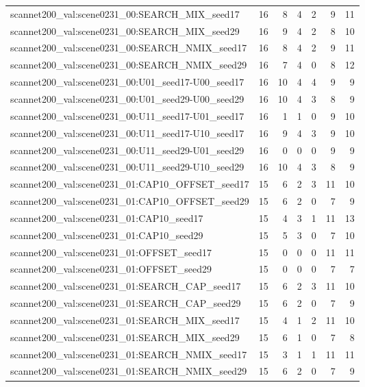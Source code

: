 \begin{table}[t]
\begin{tabular}{lrrrrrr}
scannet200\_val:scene0231\_00:SEARCH\_MIX\_seed17 & 16 & 8 & 4 & 2 & 9 & 11 \\
scannet200\_val:scene0231\_00:SEARCH\_MIX\_seed29 & 16 & 9 & 4 & 2 & 8 & 10 \\
scannet200\_val:scene0231\_00:SEARCH\_NMIX\_seed17 & 16 & 8 & 4 & 2 & 9 & 11 \\
scannet200\_val:scene0231\_00:SEARCH\_NMIX\_seed29 & 16 & 7 & 4 & 0 & 8 & 12 \\
scannet200\_val:scene0231\_00:U01\_seed17-U00\_seed17 & 16 & 10 & 4 & 4 & 9 & 9 \\
scannet200\_val:scene0231\_00:U01\_seed29-U00\_seed29 & 16 & 10 & 4 & 3 & 8 & 9 \\
scannet200\_val:scene0231\_00:U11\_seed17-U01\_seed17 & 16 & 1 & 1 & 0 & 9 & 10 \\
scannet200\_val:scene0231\_00:U11\_seed17-U10\_seed17 & 16 & 9 & 4 & 3 & 9 & 10 \\
scannet200\_val:scene0231\_00:U11\_seed29-U01\_seed29 & 16 & 0 & 0 & 0 & 9 & 9 \\
scannet200\_val:scene0231\_00:U11\_seed29-U10\_seed29 & 16 & 10 & 4 & 3 & 8 & 9 \\
scannet200\_val:scene0231\_01:CAP10\_OFFSET\_seed17 & 15 & 6 & 2 & 3 & 11 & 10 \\
scannet200\_val:scene0231\_01:CAP10\_OFFSET\_seed29 & 15 & 6 & 2 & 0 & 7 & 9 \\
scannet200\_val:scene0231\_01:CAP10\_seed17 & 15 & 4 & 3 & 1 & 11 & 13 \\
scannet200\_val:scene0231\_01:CAP10\_seed29 & 15 & 5 & 3 & 0 & 7 & 10 \\
scannet200\_val:scene0231\_01:OFFSET\_seed17 & 15 & 0 & 0 & 0 & 11 & 11 \\
scannet200\_val:scene0231\_01:OFFSET\_seed29 & 15 & 0 & 0 & 0 & 7 & 7 \\
scannet200\_val:scene0231\_01:SEARCH\_CAP\_seed17 & 15 & 6 & 2 & 3 & 11 & 10 \\
scannet200\_val:scene0231\_01:SEARCH\_CAP\_seed29 & 15 & 6 & 2 & 0 & 7 & 9 \\
scannet200\_val:scene0231\_01:SEARCH\_MIX\_seed17 & 15 & 4 & 1 & 2 & 11 & 10 \\
scannet200\_val:scene0231\_01:SEARCH\_MIX\_seed29 & 15 & 6 & 1 & 0 & 7 & 8 \\
scannet200\_val:scene0231\_01:SEARCH\_NMIX\_seed17 & 15 & 3 & 1 & 1 & 11 & 11 \\
scannet200\_val:scene0231\_01:SEARCH\_NMIX\_seed29 & 15 & 6 & 2 & 0 & 7 & 9 \\

\end{tabular}
\end{table}
